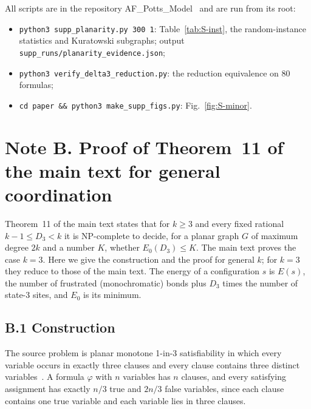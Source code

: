 \documentclass[aps,pre,onecolumn,nofootinbib]{revtex4-2}
\theoremstyle{remark}
\begin{document}
All scripts are in the repository AF\_Potts\_Model~\cite{AFPottsRepo} and are run from its root:
\begin{itemize}
\item \texttt{python3 supp\_planarity.py 300 1}: Table~\ref{tab:S-inst}, the random-instance
statistics and Kuratowski subgraphs; output \texttt{supp\_runs/planarity\_evidence.json};
\item \texttt{python3 verify\_delta3\_reduction.py}: the reduction equivalence on 80 formulas;
\item \texttt{cd paper \&\& python3 make\_supp\_figs.py}: Fig.~\ref{fig:S-minor}.
\end{itemize}

\section*{Note B. Proof of Theorem~11 of the main text for general coordination}

Theorem~11 of the main text states that for $k\ge3$ and every fixed rational $k-1\le D_3<k$ it is
NP-complete to decide, for a planar graph $G$ of maximum degree $2k$ and a number $K$, whether
$E_0(D_3)\le K$. The main text proves the case $k=3$. Here we give the construction and the proof
for general $k$; for $k=3$ they reduce to those of the main text. The energy of a configuration $s$
is $E(s)$, the number of frustrated (monochromatic) bonds plus $D_3$ times the number of state-3
sites, and $E_0$ is its minimum.

\subsection*{B.1 Construction}

The source problem is planar monotone 1-in-3 satisfiability in which every variable occurs in
exactly three clauses and every clause contains three distinct variables~\cite{MooreRobson2001}.
A formula $\varphi$ with $n$ variables has $n$ clauses, and every satisfying assignment has exactly
$n/3$ true and $2n/3$ false variables, since each clause contains one true variable and each
variable lies in three clauses.
\end{document}
